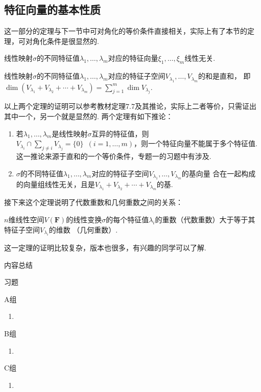 \subsection{特征向量的基本性质}
这一部分的定理与下一节中可对角化的等价条件直接相关，实际上有了本节的定理，可对角化条件是很显然的.
\begin{theorem}
    线性映射$\sigma$的不同特征值$\lambda_1,\ldots,\lambda_m$对应的特征向量$\xi_1,\ldots,\xi_m$线性无关.
\end{theorem}
\begin{theorem}
    线性映射$\sigma$的不同特征值$\lambda_1,\ldots,\lambda_m$对应的特征子空间$V_{\lambda_1},\ldots,V_{\lambda_m}$的和是直和，
    即$\dim(V_{\lambda_1}+V_{\lambda_2}+\cdots+V_{\lambda_m})=\displaystyle\sum_{j=1}^{m}\dim V_{\lambda_j}$.
\end{theorem}
以上两个定理的证明可以参考教材定理7.7及其推论，实际上二者等价，只需证出其中一个，另一个就是显然的.
两个定理有如下推论：
\begin{enumerate}
    \item 若$\lambda_1,\ldots,\lambda_m$是线性映射$\sigma$互异的特征值，则$V_{\lambda_i}\cap\sum\limits_{j\neq i}V_{\lambda_j}=\{0\}
    \enspace(i=1,\ldots,m)$，则一个特征向量不能属于多个特征值.这一推论来源于直和的一个等价条件，专题一的习题中有涉及.

    \item $\sigma$的不同特征值$\lambda_1,\ldots,\lambda_m$对应的特征子空间$V_{\lambda_1},\ldots,V_{\lambda_m}$的基向量
    合在一起构成的向量组线性无关，且是$V_{\lambda_1}+V_{\lambda_2}+\cdots+V_{\lambda_m}$的基.
\end{enumerate}

接下来这个定理说明了代数重数和几何重数之间的关系：
\begin{theorem}
    $n$维线性空间$V(\mathbf{F})$的线性变换$\sigma$的每个特征值$\lambda_i$的重数（代数重数）大于等于其特征子空间$V_{\lambda_i}$的维数
    （几何重数）.
\end{theorem}
这一定理的证明比较复杂，版本也很多，有兴趣的同学可以了解.

\vspace{2ex}
\centerline{\heiti \Large 内容总结}

\vspace{2ex}

\centerline{\heiti \Large 习题}
\vspace{2ex}
{\kaishu }
\begin{flushright}
    \kaishu

\end{flushright}
\centerline{\heiti A组}
\begin{enumerate}
    \item
\end{enumerate}
\centerline{\heiti B组}
\begin{enumerate}
    \item
\end{enumerate}
\centerline{\heiti C组}
\begin{enumerate}
    \item
\end{enumerate}
